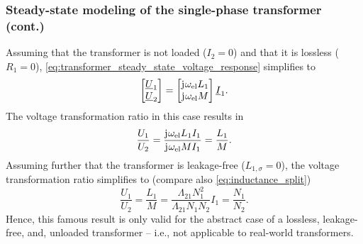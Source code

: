 \begin{frame}
	\frametitle{Steady-state modeling of the single-phase transformer (cont.)}
		Assuming that the transformer is not loaded ($I_2 = 0$) and that it is lossless ($R_1 = 0$), \eqref{eq:transformer_steady_state_voltage_response} simplifies to
		\begin{equation}
			\begin{bmatrix} \underline{U}_1 \\ \underline{U}_2 \end{bmatrix} = \begin{bmatrix} \mathrm{j}\mkern1mu \omega_\mathrm{el} L_1  \\ \mathrm{j}\mkern1mu \omega_\mathrm{el} M  \end{bmatrix} \underline{I}_1.
		\end{equation}
		The voltage transformation ratio in this case results in
		\begin{equation}
			\frac{U_1}{U_2} = \frac{\mathrm{j}\mkern1mu \omega_{\mathrm{el}} L_1 I_1}{\mathrm{j}\mkern1mu \omega_{\mathrm{el}} M I_1}  = \frac{L_1}{M}.
		\end{equation}
		Assuming further that the transformer is leakage-free ($L_{1,\sigma}=0$), the voltage transformation ratio simplifies to (compare also \eqref{eq:inductance_split})
		\begin{equation}
			\frac{U_1}{U_2} = \frac{L_1}{M} = \frac{\Lambda_{21}N_1^2}{\Lambda_{21}N_1 N_2} I_1 = \frac{N_1}{N_2}.
		\end{equation}
		Hence, this famous result is only valid for the abstract case of a lossless, leakage-free, and, unloaded transformer -- i.e., not applicable to real-world transformers.
\end{frame}

